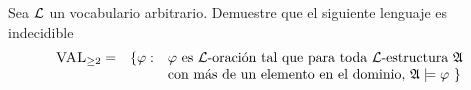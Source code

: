 Sea $\mathcal{L}$ un vocabulario arbitrario. Demuestre que el siguiente lenguaje es indecidible
$$
\begin{array}{rcl}
	\textsc{VAL}_{\geq2} = & \{\varphi: & \varphi\text{ es }\mathcal{L}\text{-oración tal que para toda }\mathcal{L}\text{-estructura }\mathfrak{A}\\
	& & \text{con más de un elemento en el dominio, }\mathfrak{A}\models\varphi\  \}
\end{array}
$$


